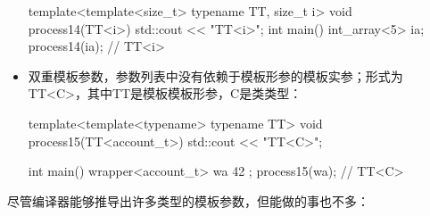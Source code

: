 \begin{itemize}
\begin{cppcode}
template<template<size_t> typename TT, size_t i>
void process14(TT<i>) { std::cout << "TT<i>\n"; }
int main()
{
	int_array<5> ia{};
	process14(ia); // TT<i>
}
\end{cppcode}
  \item 双重模板参数，参数列表中没有依赖于模板形参的模板实参；形式为TT<C>，其中TT是模板模板形参，C是类类型：

\begin{cppcode}
template<template<typename> typename TT>
void process15(TT<account_t>) { std::cout << "TT<C>\n"; }

int main()
{
	wrapper<account_t> wa{ {42} };
	process15(wa); // TT<C>
}
\end{cppcode}
\end{itemize}

尽管编译器能够推导出许多类型的模板参数，但能做的事也不多：

